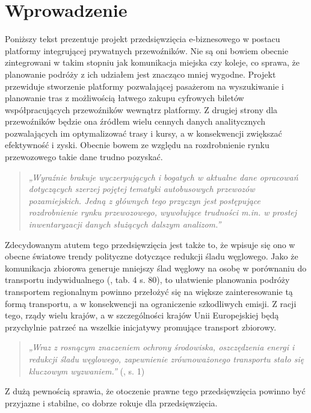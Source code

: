 \chapter{Wprowadzenie}
\label{chap:pierwszy}


Poniższy tekst prezentuje projekt przedsięwzięcia e-biznesowego w postacu platformy integrującej prywatnych przewoźników.
Nie są oni bowiem obecnie zintegrowani w takim stopniu jak komunikacja miejska czy koleje, co sprawa, że planowanie podróży z ich udziałem jest znacząco mniej wygodne. Projekt przewiduje stworzenie platformy pozwalającej pasażerom na wyszukiwanie i planowanie tras z możliwością łatwego zakupu cyfrowych biletów współpracujących przewoźników wewnątrz platformy. Z drugiej strony dla przewoźników będzie ona źródłem wielu cennych danych analitycznych pozwalających im optymalizować trasy i kursy, a w konsekwencji zwiększać efektywność i zyski. Obecnie bowem ze względu na rozdrobnienie rynku przewozowego takie dane trudno pozyskać.
\begin{quote}
    \textit{„Wyraźnie brakuje wyczerpujących i bogatych w aktualne dane opracowań dotyczących szerzej pojętej tematyki autobusowych przewozów pozamiejskich. Jedną z głównych tego przyczyn jest postępujące rozdrobnienie rynku przewozowego, wywołujące trudności m.in. w prostej inwentaryzacji danych służących dalszym analizom.”} \citep{Wolański_Mrozowski_Pieróg_2016}
\end{quote}
Zdecydowanym atutem tego przedsięwzięcia jest także to, że wpisuje się ono w obecne światowe trendy polityczne dotyczące redukcji śladu węglowego. Jako że komunikacja zbiorowa generuje mniejszy ślad węglowy na osobę w porównaniu do transportu indywidualnego (\citealt{Szymalski_Bukowicka_2022}, tab. 4 s. 80), to ułatwienie planowania podróży transportem regionalnym powinno przełożyć się na większe zainteresowanie tą formą transportu, a w konsekwencji na ograniczenie szkodliwych emisji. Z racji tego, rządy wielu krajów, a w szczególności krajów Unii Europejskiej będą przychylnie patrzeć na wszelkie inicjatywy promujące transport zbiorowy. 
\begin{quote}\textit{„Wraz z rosnącym znaczeniem ochrony środowiska, oszczędzenia energi i redukcji śladu węglowego, zapewnienie zrównoważonego transportu stało się kluczowym wyzwaniem.”}
(\citealt{Chung2023-ih}, s. 1) \end{quote}
Z dużą pewnością sprawia, że otoczenie prawne tego przedsięwzięcia powinno być przyjazne i stabilne, co dobrze rokuje dla przedsięwzięcia.

